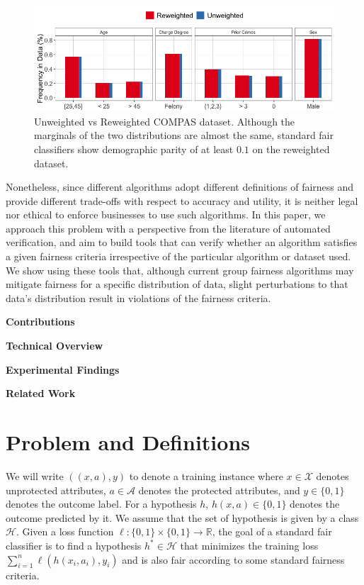 \documentclass{article}
\newcommand{\set}[1]{\{#1\}}
\newcommand{\bbR}{\mathbb{R}}
\newcommand{\Xc}{\mathcal{X}}
\newcommand{\Ac}{\mathcal{A}}
\newcommand{\Hc}{\mathcal{H}}
\begin{document}
\begin{figure}[h!]
\centering
\includegraphics[scale=0.4]{Compas_DP_marginals.png}
\caption{Unweighted vs Reweighted COMPAS dataset. Although the marginals of the two distributions are almost the same, standard fair classifiers show demographic parity of at least $0.1$ on the reweighted dataset.\label{fig:compas-dp-dif}}
\end{figure}

Nonetheless, since different algorithms adopt different definitions of fairness and provide different trade-offs with respect to accuracy and utility, it is neither legal nor ethical to enforce businesses to use such algorithms. In this paper, we approach this problem with a perspective from the literature of automated verification, and aim to build tools that can verify whether an algorithm satisfies a given fairness criteria irrespective of the particular algorithm or dataset used. We show using these tools that, although current group fairness algorithms may mitigate fairness for a specific distribution of data, slight perturbations to that data's distribution result in violations of the fairness criteria. 

\noindent \textbf{Contributions}

\noindent \textbf{Technical Overview}

\noindent \textbf{Experimental Findings}

\noindent \textbf{Related Work}

\section{Problem and Definitions}

We will write $((x,a),y)$ to denote a training instance where $x \in \Xc$ denotes unprotected attributes, $a \in \Ac$ denotes the protected attributes, and $y \in \set{0,1}$ denotes the outcome label. For a hypothesis $h$, $h(x,a) \in \set{0,1}$ denotes the outcome predicted by it. We assume that the set of hypothesis is given by a class $\Hc$. 
Given a loss function $\ell : \set{0,1} \times \set{0,1} \rightarrow \bbR$, the goal of a standard fair classifier is to find a hypothesis $h^* \in \Hc$ that minimizes the training loss $\sum_{i=1}^n \ell(h(x_i,a_i),y_i)$ and is also fair according to some standard fairness criteria. 
\end{document}
